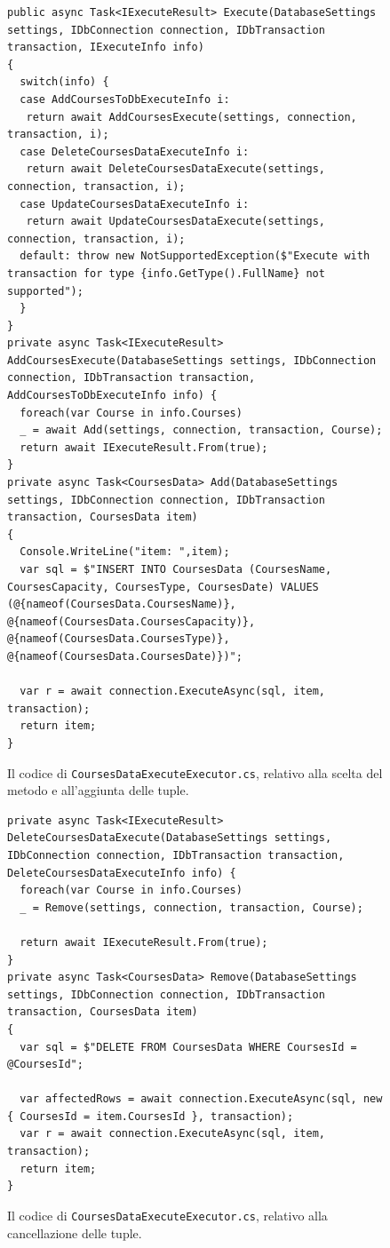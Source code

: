 \begin{figure}[H]
\begin{lstlisting}[linewidth=20cm, basicstyle=\tiny]
public async Task<IExecuteResult> Execute(DatabaseSettings settings, IDbConnection connection, IDbTransaction transaction, IExecuteInfo info)
{
  switch(info) {
  case AddCoursesToDbExecuteInfo i: 
   return await AddCoursesExecute(settings, connection, transaction, i);
  case DeleteCoursesDataExecuteInfo i:
   return await DeleteCoursesDataExecute(settings, connection, transaction, i);
  case UpdateCoursesDataExecuteInfo i:
   return await UpdateCoursesDataExecute(settings, connection, transaction, i);
  default: throw new NotSupportedException($"Execute with transaction for type {info.GetType().FullName} not supported");
  }
}
private async Task<IExecuteResult> AddCoursesExecute(DatabaseSettings settings, IDbConnection connection, IDbTransaction transaction, AddCoursesToDbExecuteInfo info) {
  foreach(var Course in info.Courses)
  _ = await Add(settings, connection, transaction, Course);
  return await IExecuteResult.From(true);
}
private async Task<CoursesData> Add(DatabaseSettings settings, IDbConnection connection, IDbTransaction transaction, CoursesData item)
{
  Console.WriteLine("item: ",item);
  var sql = $"INSERT INTO CoursesData (CoursesName, CoursesCapacity, CoursesType, CoursesDate) VALUES (@{nameof(CoursesData.CoursesName)}, @{nameof(CoursesData.CoursesCapacity)}, @{nameof(CoursesData.CoursesType)}, @{nameof(CoursesData.CoursesDate)})";

  var r = await connection.ExecuteAsync(sql, item, transaction);
  return item;
}
\end{lstlisting}
\caption{\label{fig:executor_add}Il codice di \texttt{CoursesDataExecuteExecutor.cs}, relativo alla scelta del metodo e all'aggiunta delle tuple.}
\end{figure}

\begin{figure}[H]
\begin{lstlisting}[label={lst:executor_delete}, linewidth=20cm, basicstyle=\tiny]
private async Task<IExecuteResult> DeleteCoursesDataExecute(DatabaseSettings settings, IDbConnection connection, IDbTransaction transaction, DeleteCoursesDataExecuteInfo info) {
  foreach(var Course in info.Courses)
  _ = Remove(settings, connection, transaction, Course);

  return await IExecuteResult.From(true);
}
private async Task<CoursesData> Remove(DatabaseSettings settings, IDbConnection connection, IDbTransaction transaction, CoursesData item)
{  
  var sql = $"DELETE FROM CoursesData WHERE CoursesId = @CoursesId";

  var affectedRows = await connection.ExecuteAsync(sql, new { CoursesId = item.CoursesId }, transaction);
  var r = await connection.ExecuteAsync(sql, item, transaction);
  return item;
}
\end{lstlisting}
\caption{\label{fig:executor_delete}Il codice di \texttt{CoursesDataExecuteExecutor.cs}, relativo alla cancellazione delle tuple.}
\end{figure}

